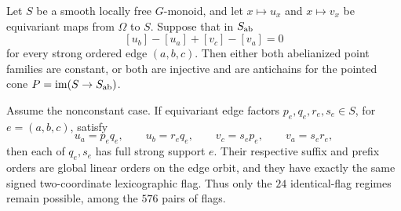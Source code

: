 \begin{proposition}
\label{G:twisted-synchronization}
Let $S$ be a smooth locally free $G$-monoid, and let
$x\mapsto u_x$ and $x\mapsto v_x$ be equivariant maps from
$\Omega$ to $S$. Suppose that in $S_{\mathrm{ab}}$
\[
 [u_b]-[u_a]+[v_c]-[v_a]=0
\]
for every strong ordered edge $(a,b,c)$.
Then either both abelianized point families are constant, or
both are injective and are antichains for the pointed cone
$P=\operatorname{im}(S\to S_{\mathrm{ab}})$.

Assume the nonconstant case. If equivariant edge factors
$p_e,q_e,r_e,s_e\in S$, for $e=(a,b,c)$, satisfy
\[
 u_a=p_eq_e,\qquad u_b=r_eq_e,\qquad
 v_c=s_ep_e,\qquad v_a=s_er_e,
\]
then each of $q_e,s_e$ has full strong support $e$.
Their respective suffix and prefix orders are global linear
orders on the edge orbit, and they have exactly the same
signed two-coordinate lexicographic flag. Thus only the
$24$ identical-flag regimes remain possible, among the $576$
pairs of flags.
\end{proposition}
